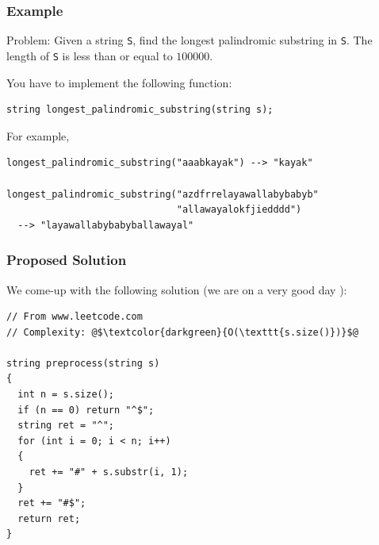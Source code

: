 \documentclass{beamer}
\begin{document}
\begin{frame}[fragile]
\frametitle{Example}

\footnotesize

\begin{mdframed}[style=exampledefault]
Problem: Given a string \texttt{S}, find the longest palindromic substring in \texttt{S}. The length of \texttt{S}
is less than or equal to $100000$.
\end{mdframed}

\vspace{0.2cm}

You have to implement the following function:
\begin{lstlisting}
string longest_palindromic_substring(string s);
\end{lstlisting}

\vspace{0.4cm}

For example,

\scriptsize

\begin{lstlisting}
longest_palindromic_substring("aaabkayak") --> "kayak"

longest_palindromic_substring("azdfrrelayawallabybabyb"
                              "allawayalokfjiedddd")
  --> "layawallabybabyballawayal"
\end{lstlisting}

\end{frame}

\begin{frame}[fragile]
\frametitle{Proposed Solution}

\scriptsize

We come-up with the following solution (we are on a very good day \dSmiley):

\vspace{0.2cm}

\begin{lstlisting}
// From www.leetcode.com
// Complexity: @$\textcolor{darkgreen}{O(\texttt{s.size()})}$@

string preprocess(string s)
{
  int n = s.size();
  if (n == 0) return "^$";
  string ret = "^";
  for (int i = 0; i < n; i++)
  {
    ret += "#" + s.substr(i, 1);
  }
  ret += "#$";
  return ret;
}
\end{lstlisting}

\end{frame}
\end{document}
